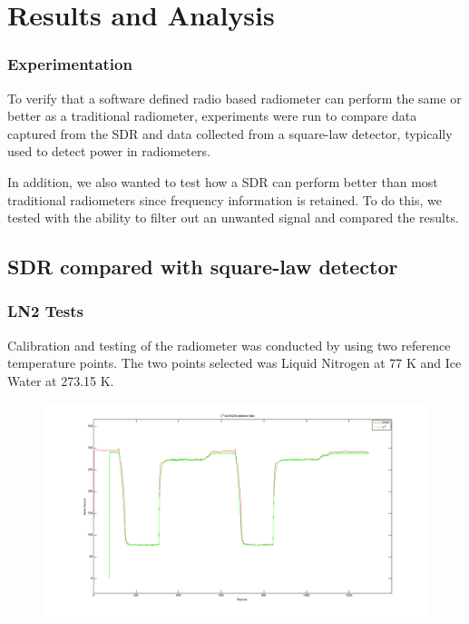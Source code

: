 \documentclass[notes]{beamer}
\begin{document}

\section{Results and Analysis}
\begin{frame}
\frametitle{Experimentation}
To verify that a software defined radio based radiometer can perform the same or better as a traditional radiometer, experiments were run to compare data captured from the SDR and data collected from a square-law detector, typically used to detect power in radiometers.  

In addition, we also wanted to test how a SDR can perform better than most traditional radiometers since frequency information is retained.  To do this, we tested with the ability to filter out an unwanted signal and compared the results.
\end{frame}
\subsection{SDR compared with square-law detector}
\begin{frame}
\frametitle{LN2 Tests}
Calibration and testing of the radiometer was conducted by using two reference temperature points.  The two points selected was Liquid Nitrogen at 77 K and Ice Water at 273.15 K. 

\begin{figure}\label{LN2_stability}
\includegraphics[width=1.0\linewidth]{images/lab1_both_calib.png}
\end{figure} 
\end{frame}
\end{document}
